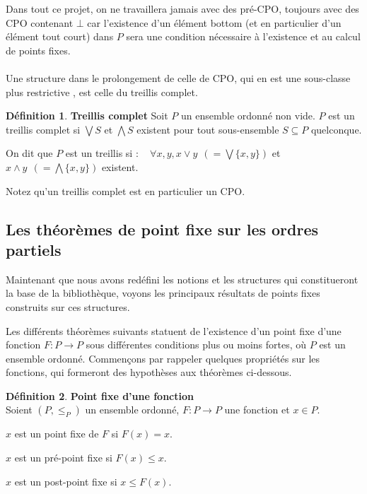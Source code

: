 \documentclass{article}
\newcommand{\yz}[1]{\textcolor{blue}{{[YZ:~#1]}}}
\theoremstyle{definition}
\newtheorem{definition}{Définition}[section]
\begin{document}
Dans tout ce projet, on ne travaillera jamais avec des pré-CPO, toujours avec des CPO contenant $\bot$ car l'existence d'un élément bottom (et en particulier d'un élément tout court) dans $P$ sera une condition nécessaire à l'existence et au calcul de points fixes.

\paragraph{}

Une structure dans le prolongement de celle de CPO, qui en est une sous-classe plus restrictive %
, est celle du treillis complet.

\begin{definition}{\textbf{Treillis complet}}
Soit $P$ un ensemble ordonné non vide. $P$ est un treillis complet si $\bigvee S$ et $\bigwedge S$ existent pour tout sous-ensemble $S \subseteq P$ quelconque.

On dit que $P$ est un treillis si : ~ $\forall x, y, x \vee y ~~ (= \bigvee \{x,y\})$ et $x \wedge y ~~ (= \bigwedge \{x,y\})$ existent.
\end{definition}
Notez qu'un treillis complet est en particulier un CPO.

\subsection{Les théorèmes de point fixe sur les ordres partiels}

Maintenant que nous avons redéfini les notions et les structures qui constitueront la base de la bibliothèque, voyons les principaux résultats de points fixes construits sur ces structures.

Les différents théorèmes suivants statuent de l'existence d'un point fixe d'une fonction $F : P \rightarrow P$ sous différentes conditions plus ou moins fortes, où $P$ est un ensemble ordonné. Commençons par rappeler quelques propriétés sur les fonctions, qui formeront des hypothèses aux théorèmes ci-dessous.

\begin{definition}{\textbf{Point fixe d'une fonction\\}}
\label{fixpoint-def}
Soient $(P, \leq_P)$ un ensemble ordonné, $F : P \rightarrow P$ une fonction et $x \in P$. 

$x$ est un point fixe de $F$ si $F(x) = x$.

$x$ est un pré-point fixe si $F(x) \leq x$.

$x$ est un post-point fixe si $x \leq F(x)$.
\end{definition}
\end{document}

